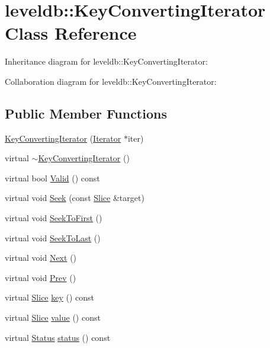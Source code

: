 \hypertarget{classleveldb_1_1_key_converting_iterator}{}\section{leveldb\+:\+:Key\+Converting\+Iterator Class Reference}
\label{classleveldb_1_1_key_converting_iterator}


Inheritance diagram for leveldb\+:\+:Key\+Converting\+Iterator\+:


Collaboration diagram for leveldb\+:\+:Key\+Converting\+Iterator\+:
\subsection*{Public Member Functions}
\begin{DoxyCompactItemize}
\item 
\hyperlink{classleveldb_1_1_key_converting_iterator_a7b5c28a94749f2e02ecc9021bb9adb51}{Key\+Converting\+Iterator} (\hyperlink{classleveldb_1_1_iterator}{Iterator} $\ast$iter)
\item 
virtual \hyperlink{classleveldb_1_1_key_converting_iterator_a2a774b0a90768168394ca0c35ba3a87e}{$\sim$\+Key\+Converting\+Iterator} ()
\item 
virtual bool \hyperlink{classleveldb_1_1_key_converting_iterator_a941cabf2e0b1c9647faa037b7ad55668}{Valid} () const 
\item 
virtual void \hyperlink{classleveldb_1_1_key_converting_iterator_a6af9b763a5831c2fdcd8c3bebfef6ae4}{Seek} (const \hyperlink{classleveldb_1_1_slice}{Slice} \&target)
\item 
virtual void \hyperlink{classleveldb_1_1_key_converting_iterator_a56a6b7b97747d5e33981a66c28670cc9}{Seek\+To\+First} ()
\item 
virtual void \hyperlink{classleveldb_1_1_key_converting_iterator_a9db639879c442a67234fc345887b19fc}{Seek\+To\+Last} ()
\item 
virtual void \hyperlink{classleveldb_1_1_key_converting_iterator_a6b468c158da3f6abbc697f7728811da8}{Next} ()
\item 
virtual void \hyperlink{classleveldb_1_1_key_converting_iterator_adff607836b7b3d117a524b3d440bc55a}{Prev} ()
\item 
virtual \hyperlink{classleveldb_1_1_slice}{Slice} \hyperlink{classleveldb_1_1_key_converting_iterator_a46402aaa27d57c5b2bee4f560c2dc04b}{key} () const 
\item 
virtual \hyperlink{classleveldb_1_1_slice}{Slice} \hyperlink{classleveldb_1_1_key_converting_iterator_aa7a0281f93fbd520bf54d94bac77197a}{value} () const 
\item 
virtual \hyperlink{classleveldb_1_1_status}{Status} \hyperlink{classleveldb_1_1_key_converting_iterator_a10d0f5b6b83bc967ba5c73d6bfc919f3}{status} () const 
\end{DoxyCompactItemize}
